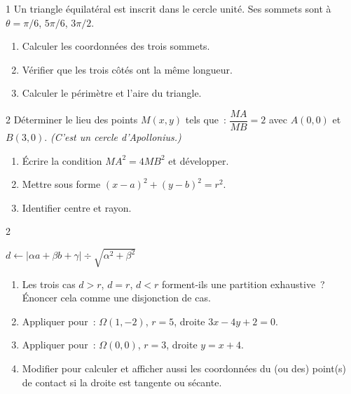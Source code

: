 \begin{exo}{1}
Un triangle \'equilat\'eral est inscrit dans le cercle unit\'e.
Ses sommets sont \`a $\theta=\pi/6$, $5\pi/6$, $3\pi/2$.
\begin{enumerate}
  \item Calculer les coordonn\'ees des trois sommets.
  \item V\'erifier que les trois c\^ot\'es ont la m\^eme longueur.
  \item Calculer le p\'erim\`etre et l'aire du triangle.
\end{enumerate}
\end{exo}

\begin{exo}{2}
D\'eterminer le lieu des points $M(x,y)$ tels que~:
$\dfrac{MA}{MB}=2$ avec $A(0,0)$ et $B(3,0)$.
\emph{(C'est un cercle d'Apollonius.)}
\begin{enumerate}
  \item \'Ecrire la condition $MA^2=4MB^2$ et d\'evelopper.
  \item Mettre sous forme $(x-a)^2+(y-b)^2=r^2$.
  \item Identifier centre et rayon.
\end{enumerate}
\end{exo}

\begin{exo}{2}

\begin{algorithm}[H]
\caption{Position relative droite/cercle}
$d \leftarrow |\alpha a + \beta b + \gamma| \div \sqrt{\alpha^2+\beta^2}$\;
\end{algorithm}

\begin{enumerate}
  \item Les trois cas $d>r$, $d=r$, $d<r$ forment-ils une partition exhaustive~?
        \'Enoncer cela comme une disjonction de cas.
  \item Appliquer pour~: $\Omega(1,-2)$, $r=5$, droite $3x-4y+2=0$.
  \item Appliquer pour~: $\Omega(0,0)$, $r=3$, droite $y=x+4$.
  \item Modifier pour calculer et afficher aussi les coordonn\'ees
        du (ou des) point(s) de contact si la droite est tangente
        ou s\'ecante.
\end{enumerate}
\end{exo}

